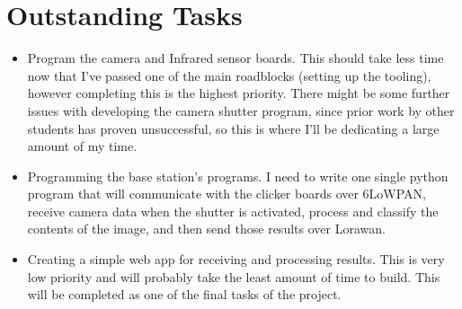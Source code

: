 \documentclass{article}
\begin{document}
\section*{Outstanding Tasks}

\begin{itemize}
    \item Program the camera and Infrared sensor boards. This should take
    less time now that I've passed one of the main roadblocks (setting up the
    tooling), however completing this is the highest priority. There might be
    some further issues with developing the camera shutter program, since
    prior work by other students has proven unsuccessful, so this is where
    I'll be dedicating a large amount of my time.
    \item Programming the base station's programs. I need to write one single
    python program that will communicate with the clicker boards over
    6LoWPAN, receive camera data when the shutter is activated, process and
    classify the contents of the image, and then send those results over
    Lorawan.
    \item Creating a simple web app for receiving and processing results.
    This is very low priority and will probably take the least amount of time
    to build. This will be completed as one of the final tasks of the
    project.
\end{itemize}
\end{document}
